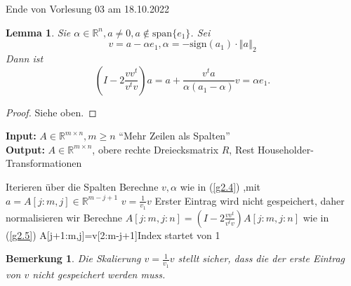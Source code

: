 \documentclass{book}
\newtheorem{lemma}[algorithm]{Lemma}
\newtheorem{remark}[algorithm]{Bemerkung}
\def\R{\mathbb{R}}
\begin{document}
            \noindent
            \xrfill[0.7ex]{1pt}Ende von Vorlesung 03 am 18.10.2022\xrfill[0.7ex]{1pt}
            
            \begin{lemma}\label{l2.18}
                Sie $\alpha\in\R^n,a\neq 0,a\notin\text{span}\{e_1\}$. 
                Sei \begin{equation}\label{g2.4}
                    v=a-\alpha e_1,\alpha =-\text{sign}(a_1)\cdot \left\Vert a \right\Vert_2
                \end{equation} %
                Dann ist
                \begin{equation}\label{g2.5}
                    \left(I-2\frac{vv^t}{v^tv}\right)a=a+\frac{v^ta}{\alpha(a_1-\alpha)}v=\alpha e_1.
                \end{equation}
            \end{lemma}

            \begin{proof}
                Siehe oben.
            \end{proof}

            \begin{algorithm}[H]\label{a2.19}
                \caption{}
                \textbf{Input:} $A\in\R^{m\times n},m\geq n$ ``Mehr Zeilen als Spalten''\\
                \textbf{Output:} $A\in\R^{m\times n}$, obere rechte Dreiecksmatrix $R$, Rest Householder-Transformationen
                \begin{algorithmic}
                 \Comment Iterieren über die Spalten
                    \State Berechne $v,\alpha$ wie in (\ref{g2.4}) ,mit $a=A[j:m,j]\in\R^{m-j+1}$
                    \State $v=\frac{1}{v_1}v$ \Comment Erster Eintrag wird nicht gespeichert, daher normalisieren wir
                    \State Berechne $A[j:m,j:n]=\left(I-2\frac{vv^t}{v^tv}\right)A[j:m,j:n]$ wie in (\ref{g2.5})
                        \State A[j+1:m,j]=v[2:m-j+1]\Comment Index startet von 1 
                    \EndIf
                \EndFor
                \end{algorithmic}
            \end{algorithm}

            \begin{remark}\label{b2.20}
                Die Skalierung $v=\frac{1}{v_1}v$ stellt sicher, dass die der erste Eintrag von $v$ nicht gespeichert werden muss.
            \end{remark}
\end{document}

